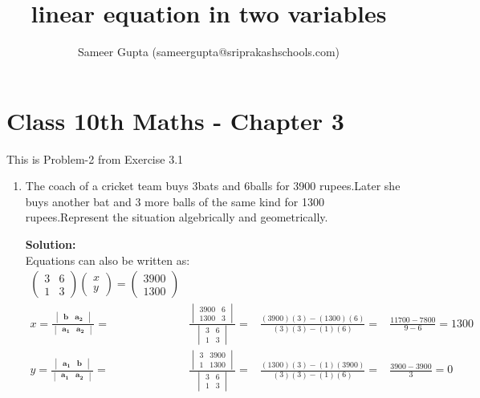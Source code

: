 \documentclass[12pt]{article}
\title{linear equation in two variables}
\author{Sameer Gupta (sameergupta@sriprakashschools.com)}
\newcommand{\myvec}[1]{\ensuremath{\begin{pmatrix}#1\end{pmatrix}}}
\newcommand{\mydet}[1]{\ensuremath{\begin{vmatrix}#1\end{vmatrix}}}
\newcommand{\solution}{\noindent \textbf{Solution: }}
\let\vec\mathbf
\begin{document}
\maketitle
\section*{Class 10th  Maths - Chapter 3}
This is Problem-2 from Exercise 3.1
\begin{enumerate}
\item The coach of a cricket team buys 3bats and 6balls for 3900 rupees.Later she buys another bat and 3 more balls of the same kind for 1300 rupees.Represent the situation algebrically and geometrically.

\solution\\
            Equations  can also be written as:\\     
\begin{align}
\myvec{3&6\\1&3}\myvec{x\\y} = \myvec{3900\\1300}\\
x=\frac{\mydet{ \vec{b} & \vec{a_2}}}{\mydet{ \vec{a_1} &\vec{a_2} }} =&
\frac{\mydet{ 3900 & 6 \\ 1300 & 3 }}{\mydet{3&6\\1&3}} =&
\frac{(3900)(3)-(1300)(6)}{(3)(3)-(1)(6)} =&
\frac{11700-7800}{9-6} =1300  \\
y=\frac{\mydet{\vec{a_1}&\vec{b}}}{\mydet{\vec{a_1}&\vec{a_2}}} =&
\frac{\mydet{3&3900\\1&1300}}{\mydet{3&6\\1&3}} =&
\frac{(1300)(3)-(1)(3900)}{(3)(3)-(1)(6)} =&
\frac{3900-3900}{3} = 0\\
\end{align}

\end{enumerate}
\end{document}
